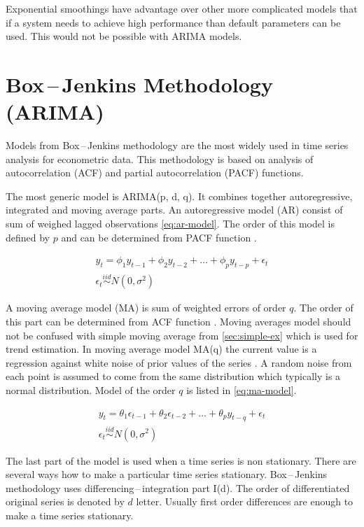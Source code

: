     Exponential smoothings have advantage over other more complicated models that if a system needs to achieve high
    performance than default parameters can be used. This would not be possible with ARIMA models.

    \section{Box\,--\,Jenkins Methodology (ARIMA)} \label{sec:arima}
    Models from Box\,--\,Jenkins methodology are the most widely used in time series analysis for econometric data.
    This methodology is based on analysis of autocorrelation (ACF) and partial autocorrelation (PACF) functions.
    
    The most generic model is ARIMA(p, d, q). It combines together autoregressive, integrated and
    moving average parts. An autoregressive model (AR) consist of sum of weighed lagged observations \ref{eq:ar-model}.
    The order of this model is defined by $p$ and can be determined from PACF function \cite{cipra}.

    \begin{gather} \label{eq:ar-model}
        y_t = \phi_1 y_{t-1} + \phi_2 y_{t-2} + \dots + \phi_p y_{t-p} + \epsilon_t \\ \nonumber
        \epsilon_t \overset{iid}{\sim} N(0, \sigma^2)
    \end{gather}

    A moving average model (MA) is sum of weighted errors of order $q$. The order of this part can be determined
    from ACF function \cite{cipra}. Moving averages model should not be confused with simple moving average from
    \ref{sec:simple-ex} which is used for trend estimation. In moving average model MA(q) the current value is a
    regression against white noise of prior values of the series \cite{wiki-ma-model}. A random noise from each
    point is assumed to come from the same distribution which typically is a normal distribution.  Model of the order
    $q$ is listed in \ref{eq:ma-model}.

    \begin{gather} \label{eq:ma-model}
        y_t = \theta_1 \epsilon_{t-1} + \theta_2 \epsilon_{t-2} + \dots + \theta_p y_{t-q} + \epsilon_t \\ \nonumber
        \epsilon_t \overset{iid}{\sim} N(0, \sigma^2)
    \end{gather}

    The last part of the model is used when a time series is non stationary. There are several ways how to make a
    particular time series stationary. Box\,--\,Jenkins methodology uses differencing\,--\,integration part I(d).  The
    order of differentiated original series is denoted by $d$ letter. Usually first order differences are enough to
    make a time series stationary.

